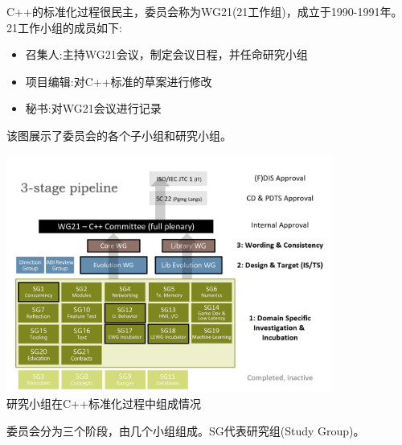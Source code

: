 
C++的标准化过程很民主，委员会称为WG21(21工作组)，成立于1990-1991年。21工作小组的成员如下:

\begin{itemize}
\item 
召集人:主持WG21会议，制定会议日程，并任命研究小组

\item 
项目编辑:对C++标准的草案进行修改

\item 
秘书:对WG21会议进行记录
\end{itemize}

该图展示了委员会的各个子小组和研究小组。

\begin{center}
\includegraphics[width=0.8\textwidth]{content/1/chapter2/images/1.png}\\
研究小组在C++标准化过程中组成情况
\end{center}

委员会分为三个阶段，由几个小组组成。SG代表研究组(Study Group)。